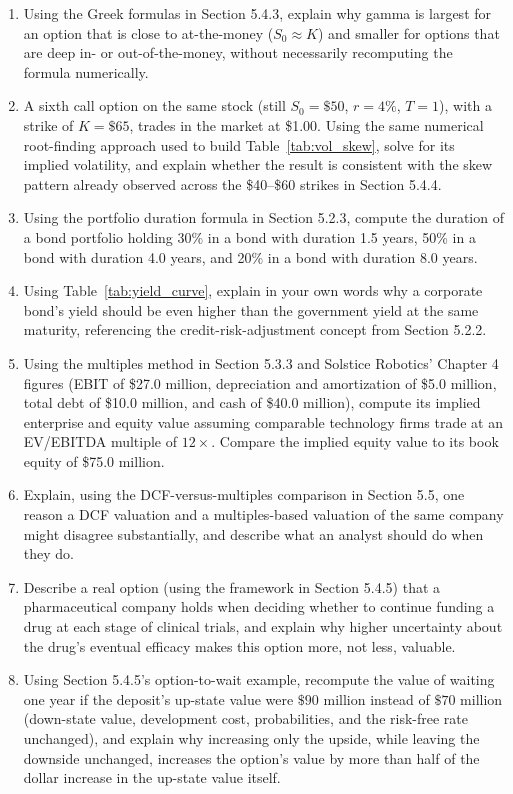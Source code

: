 \documentclass[../ai_in_finance]{subfiles}
\begin{document}
\begin{enumerate}
    \item Using the Greek formulas in Section 5.4.3, explain why gamma is largest for an option that is close to at-the-money ($S_0 \approx K$) and smaller for options that are deep in- or out-of-the-money, without necessarily recomputing the formula numerically.
    \item A sixth call option on the same stock (still $S_0=\$50$, $r=4\%$, $T=1$), with a strike of $K=\$65$, trades in the market at \$1.00. Using the same numerical root-finding approach used to build Table~\ref{tab:vol_skew}, solve for its implied volatility, and explain whether the result is consistent with the skew pattern already observed across the \$40--\$60 strikes in Section 5.4.4.
    \item Using the portfolio duration formula in Section 5.2.3, compute the duration of a bond portfolio holding 30\% in a bond with duration 1.5 years, 50\% in a bond with duration 4.0 years, and 20\% in a bond with duration 8.0 years.
    \item Using Table~\ref{tab:yield_curve}, explain in your own words why a corporate bond's yield should be even higher than the government yield at the same maturity, referencing the credit-risk-adjustment concept from Section 5.2.2.
    \item Using the multiples method in Section 5.3.3 and Solstice Robotics' Chapter 4 figures (EBIT of \$27.0 million, depreciation and amortization of \$5.0 million, total debt of \$10.0 million, and cash of \$40.0 million), compute its implied enterprise and equity value assuming comparable technology firms trade at an EV/EBITDA multiple of $12\times$. Compare the implied equity value to its book equity of \$75.0 million.
    \item Explain, using the DCF-versus-multiples comparison in Section 5.5, one reason a DCF valuation and a multiples-based valuation of the same company might disagree substantially, and describe what an analyst should do when they do.
    \item Describe a real option (using the framework in Section 5.4.5) that a pharmaceutical company holds when deciding whether to continue funding a drug at each stage of clinical trials, and explain why higher uncertainty about the drug's eventual efficacy makes this option more, not less, valuable.
    \item Using Section 5.4.5's option-to-wait example, recompute the value of waiting one year if the deposit's up-state value were $\$90$ million instead of $\$70$ million (down-state value, development cost, probabilities, and the risk-free rate unchanged), and explain why increasing only the upside, while leaving the downside unchanged, increases the option's value by more than half of the dollar increase in the up-state value itself.

\end{enumerate}
\end{document}
